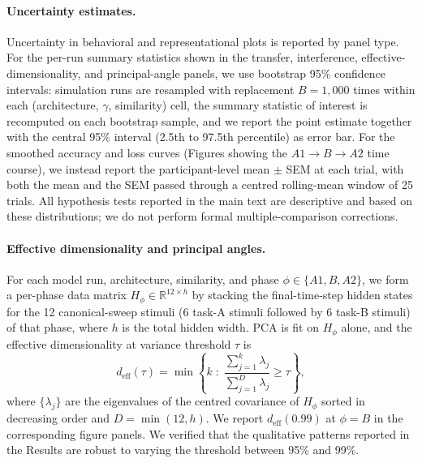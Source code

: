 \documentclass{article}
\theoremstyle{plain}
\theoremstyle{definition}
\theoremstyle{remark}
\begin{document}
\paragraph{Uncertainty estimates.}
Uncertainty in behavioral and representational plots is reported by panel type. For the per-run summary statistics shown in the transfer, interference, effective-dimensionality, and principal-angle panels, we use bootstrap 95\% confidence intervals: simulation runs are resampled with replacement $B = 1{,}000$ times within each (architecture, $\gamma$, similarity) cell, the summary statistic of interest is recomputed on each bootstrap sample, and we report the point estimate together with the central 95\% interval (2.5th to 97.5th percentile) as error bar. For the smoothed accuracy and loss curves (Figures showing the $A1 \rightarrow B \rightarrow A2$ time course), we instead report the participant-level mean $\pm$ SEM at each trial, with both the mean and the SEM passed through a centred rolling-mean window of 25 trials. All hypothesis tests reported in the main text are descriptive and based on these distributions; we do not perform formal multiple-comparison corrections.

\paragraph{Effective dimensionality and principal angles.}
For each model run, architecture, similarity, and phase $\phi \in \{A1, B, A2\}$, we form a per-phase data matrix $H_\phi \in \mathbb{R}^{12 \times h}$ by stacking the final-time-step hidden states for the 12 canonical-sweep stimuli (6 task-A stimuli followed by 6 task-B stimuli) of that phase, where $h$ is the total hidden width. PCA is fit on $H_\phi$ alone, and the effective dimensionality at variance threshold $\tau$ is
\[
d_{\mathrm{eff}}(\tau) = \min\!\left\{ k \;:\; \frac{\sum_{j=1}^k \lambda_j}{\sum_{j=1}^{D} \lambda_j} \geq \tau \right\},
\]
where $\{\lambda_j\}$ are the eigenvalues of the centred covariance of $H_\phi$ sorted in decreasing order and $D = \min(12, h)$. We report $d_{\mathrm{eff}}(0.99)$ at $\phi = B$ in the corresponding figure panels. We verified that the qualitative patterns reported in the Results are robust to varying the threshold between 95\% and 99\%.
\end{document}
